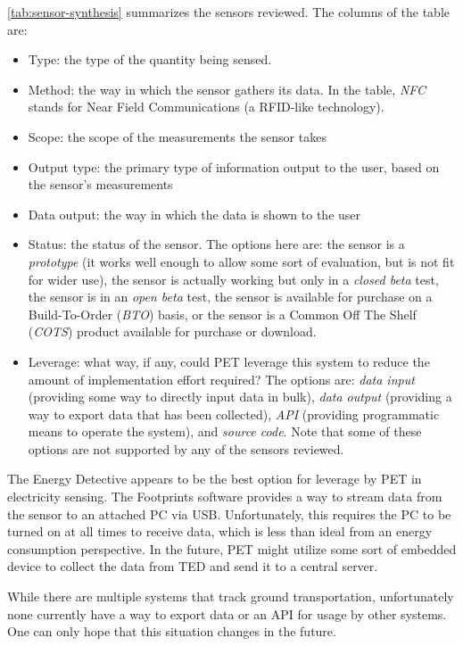 \autoref{tab:sensor-synthesis} summarizes the sensors reviewed. The columns of the table are:

\begin{itemize}
	\item Type: the type of the quantity being sensed.
	\item Method: the way in which the sensor gathers its data. In the table, \emph{NFC} stands for Near Field Communications (a RFID-like technology).
	\item Scope: the scope of the measurements the sensor takes
	\item Output type: the primary type of information output to the user, based on the sensor's measurements
	\item Data output: the way in which the data is shown to the user
	\item Status: the status of the sensor. The options here are: the sensor is a \emph{prototype} (it works well enough to allow some sort of evaluation, but is not fit for wider use), the sensor is actually working but only in a \emph{closed beta} test, the sensor is in an \emph{open beta} test, the sensor is available for purchase on a Build-To-Order (\emph{BTO}) basis, or the sensor is a Common Off The Shelf (\emph{COTS}) product available for purchase or download.
	\item Leverage: what way, if any, could PET leverage this system to reduce the amount of implementation effort required? The options are: \emph{data input} (providing some way to directly input data in bulk), \emph{data output} (providing a way to export data that has been collected), \emph{API} (providing programmatic means to operate the system), and \emph{source code}. Note that some of these options are not supported by any of the sensors reviewed.
\end{itemize}

The Energy Detective appears to be the best option for leverage by PET in electricity sensing. The Footprints software provides a way to stream data from the sensor to an attached PC via USB. Unfortunately, this requires the PC to be turned on at all times to receive data, which is less than ideal from an energy consumption perspective. In the future, PET might utilize some sort of embedded device to collect the data from TED and send it to a central server.

While there are multiple systems that track ground transportation, unfortunately none currently have a way to export data or an API for usage by other systems. One can only hope that this situation changes in the future.


